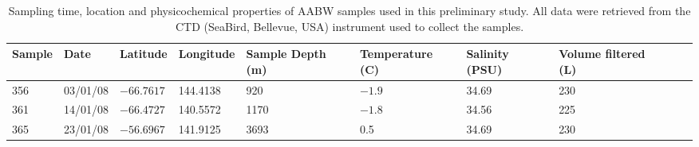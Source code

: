 \begin{table}
\caption[\ac{AABW} samples used in the preliminary analysis]{Sampling time, location and physicochemical properties of \ac{AABW} samples used in this preliminary study.
All data were retrieved from the \ac{CTD} (SeaBird, Bellevue, USA) instrument used to collect the samples.}
\label{tab:deepsamples}
\smallskip
\begin{tabularx}{\textwidth}{llllXXXXXX}
\toprule
\textbf{Sample} & \textbf{Date} & \textbf{Latitude} & \textbf{Longitude} & \textbf{Sample Depth (m)} & \textbf{Temperature (\textdegree{}C)} & \textbf{Salinity (PSU)} & \textbf{Volume \linebreak filtered (L)}\\
\midrule

356 & 03/01/08 & $-66.7617$ & 144.4138 & 920 & $-1.9$ & 34.69 & 230\\
361 & 14/01/08 & $-66.4727$ & 140.5572 & 1170 & $-1.8$ & 34.56 & 225\\
365 & 23/01/08 & $-56.6967$ & 141.9125 & 3693 & 0.5 & 34.69 & 230\\
\bottomrule
\end{tabularx}
\end{table}
